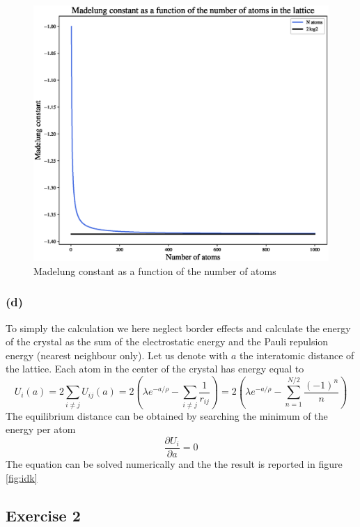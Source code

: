 \begin{figure}[h]
    \centering 
    \includegraphics[scale=0.4]{figures/madelung.eps}
    \caption{Madelung constant as a function of the number of atoms}
    \label{fig:Madelung_constant_Natoms}
\end{figure}

\subsubsection*{(d)}
To simply the calculation we here neglect border effects and calculate the energy of the crystal as the sum of the electrostatic energy and the Pauli repulsion energy (nearest neighbour only). Let us denote with $a$ the interatomic distance of the lattice. Each atom in the center of the crystal has energy equal to
\begin{equation*}
    U_i(a) = 2 \sum_{i \neq j}U_{ij}(a) = 2\left(\lambda e^{-a/\rho} - \sum_{i \neq j}\frac{1}{r_{ij}}\right) = 
    2\left(\lambda e^{-a/\rho} - \sum_{n=1}^{N/2}\frac{(-1)^{n}}{n}\right)
\end{equation*}
The equilibrium distance can be obtained by searching the minimum of the energy per atom
\begin{equation*}
    \frac{\partial U_i}{\partial a} = 0
\end{equation*}
The equation can be solved numerically and the the result is reported in figure \ref{fig:idk}

\subsection*{Exercise 2}
